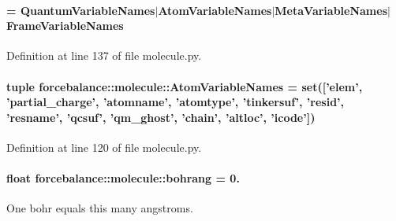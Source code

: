 \hypertarget{namespaceforcebalance_1_1molecule_ab103b4aacb65cce6b558135c39a6e9a4}{
\paragraph[{\-All\-Variable\-Names}]{ = {\bf \-Quantum\-Variable\-Names}$|${\bf \-Atom\-Variable\-Names}$|${\bf \-Meta\-Variable\-Names}$|${\bf \-Frame\-Variable\-Names}}}\label{namespaceforcebalance_1_1molecule_ab103b4aacb65cce6b558135c39a6e9a4}


\-Definition at line 137 of file molecule.\-py.

\hypertarget{namespaceforcebalance_1_1molecule_aa5faa35f222a5e9f4dae2648f0e41b73}{
\paragraph[{\-Atom\-Variable\-Names}]{\setlength{\rightskip}{0pt plus 5cm}tuple {\bf forcebalance\-::molecule\-::\-Atom\-Variable\-Names} = set(\mbox{[}'elem', 'partial\-\_\-charge', 'atomname', 'atomtype', 'tinkersuf', 'resid', 'resname', 'qcsuf', 'qm\-\_\-ghost', 'chain', 'altloc', 'icode'\mbox{]})}}\label{namespaceforcebalance_1_1molecule_aa5faa35f222a5e9f4dae2648f0e41b73}


\-Definition at line 120 of file molecule.\-py.

\hypertarget{namespaceforcebalance_1_1molecule_af69f9f12bed5faede1948498e9f0d2e5}{
\paragraph[{bohrang}]{\setlength{\rightskip}{0pt plus 5cm}float {\bf forcebalance\-::molecule\-::bohrang} = 0.}}\label{namespaceforcebalance_1_1molecule_af69f9f12bed5faede1948498e9f0d2e5}


\-One bohr equals this many angstroms. 



